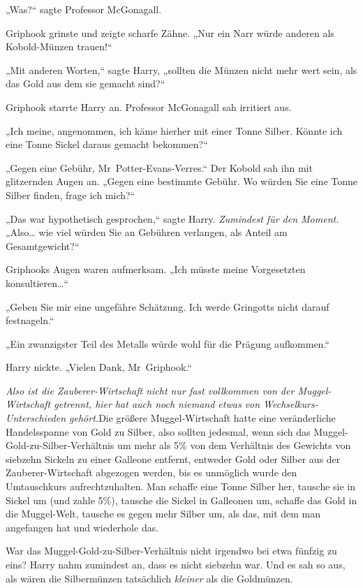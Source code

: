 {„Was?“ sagte Professor McGonagall.

Griphook grinste und zeigte scharfe Zähne. „Nur ein Narr würde anderen als Kobold-Münzen trauen!“

„Mit anderen Worten,“ sagte Harry, „sollten die Münzen nicht mehr wert sein, als das Gold aus dem sie gemacht sind?“

Griphook starrte Harry an. Professor McGonagall sah irritiert aus.

„Ich meine, angenommen, ich käme hierher mit einer Tonne Silber. Könnte ich eine Tonne Sickel daraus gemacht bekommen?“

„Gegen eine Gebühr, Mr~Potter-Evans-Verres.“ Der Kobold sah ihn mit glitzernden Augen an. „Gegen eine bestimmte Gebühr. Wo würden Sie eine Tonne Silber finden, frage ich mich?“

„Das war hypothetisch gesprochen,“ sagte Harry. \emph{Zumindest für den Moment.} „Also… wie viel würden Sie an Gebühren verlangen, als Anteil am Gesamtgewicht?“

Griphooks Augen waren aufmerksam. „Ich müsste meine Vorgesetzten konsultieren…“

„Geben Sie mir eine ungefähre Schätzung. Ich werde Gringotts nicht darauf festnageln.“

„Ein zwanzigster Teil des Metalls würde wohl für die Prägung aufkommen.“

Harry nickte. „Vielen Dank, Mr~Griphook.“

\emph{Also ist die Zauberer-Wirtschaft nicht nur fast vollkommen von der Muggel-Wirtschaft getrennt, hier hat auch noch niemand etwas von Wechselkurs-Unterschieden gehört.}Die größere Muggel-Wirtschaft hatte eine veränderliche Handelsspanne von Gold zu Silber, also sollten jedesmal, wenn sich das Muggel-Gold-zu-Silber-Verhältnis um mehr als 5\% von dem Verhältnis des Gewichts von siebzehn Sickeln zu einer Galleone entfernt, entweder Gold oder Silber aus der Zauberer-Wirtschaft abgezogen werden, bis es unmöglich wurde den Umtauschkurs aufrechtzuhalten. Man schaffe eine Tonne Silber her, tausche sie in Sickel um (und zahle 5\%), tausche die Sickel in Galleonen um, schaffe das Gold in die Muggel-Welt, tausche es gegen mehr Silber um, als das, mit dem man angefangen hat und wiederhole das.

War das Muggel-Gold-zu-Silber-Verhältnis nicht irgendwo bei etwa fünfzig zu eins? Harry nahm zumindest an, dass es nicht siebzehn war. Und es sah so aus, als wären die Silbermünzen tatsächlich \emph{kleiner} als die Goldmünzen.

}
